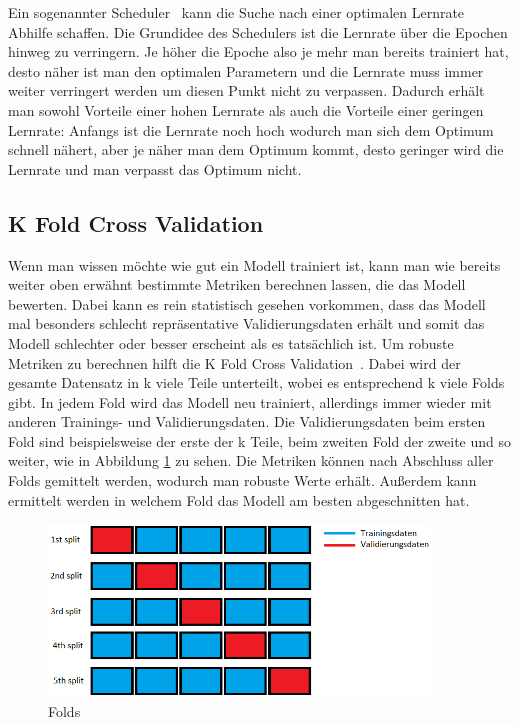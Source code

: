 \documentclass[12pt, a4paper]{article}
\begin{document}
Ein sogenannter Scheduler~\cite{o2} kann die Suche nach einer optimalen Lernrate Abhilfe schaffen. Die Grundidee des Schedulers ist die Lernrate über die Epochen hinweg zu verringern. Je höher die Epoche also je mehr man bereits trainiert hat, desto näher ist man den optimalen Parametern und die Lernrate muss immer weiter verringert werden um diesen Punkt nicht zu verpassen. Dadurch erhält man sowohl Vorteile einer hohen Lernrate als auch die Vorteile einer geringen Lernrate: Anfangs ist die Lernrate noch hoch wodurch man sich dem Optimum schnell nähert, aber je näher man dem Optimum kommt, desto geringer wird die Lernrate und man verpasst das Optimum nicht.

\subsection{K Fold Cross Validation}
Wenn man wissen möchte wie gut ein Modell trainiert ist, kann man wie bereits weiter oben erwähnt bestimmte Metriken berechnen lassen, die das Modell bewerten. Dabei kann es rein statistisch gesehen vorkommen, dass das Modell mal besonders schlecht repräsentative Validierungsdaten erhält und somit das Modell schlechter oder besser erscheint als es tatsächlich ist. Um robuste Metriken zu berechnen hilft die K Fold Cross Validation~\cite{o3}. Dabei wird der gesamte Datensatz in k viele Teile unterteilt, wobei es entsprechend k viele Folds gibt. In jedem Fold wird das Modell neu trainiert, allerdings immer wieder mit anderen Trainings- und Validierungsdaten. Die Validierungsdaten beim ersten Fold sind beispielsweise der erste der k Teile, beim zweiten Fold der zweite und so weiter, wie in Abbildung \ref{fig:folds} zu sehen. Die Metriken können nach Abschluss aller Folds gemittelt werden, wodurch man robuste Werte erhält. Außerdem kann ermittelt werden in welchem Fold das Modell am besten abgeschnitten hat.

\begin{figure}[t]
\centering
\includegraphics[width=0.9\textwidth]{folds.png}
\caption{Folds}
\label{fig:folds}
\end{figure}
\end{document}
